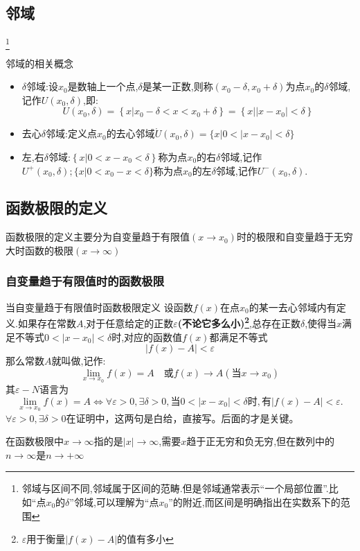 \documentclass[12pt, a4paper, oneside, UTF8]{ctexbook}  %
\begin{document}
\begin{sloppypar}
    \subsection{邻域}\footnote{邻域与区间不同,邻域属于区间的范畴.但是邻域通常表示“一个局部位置”.比如“点$x_0$的$\delta$”邻域,可以理解为“点$x_0$”的附近,而区间是明确指出在实数系下的范围}
    \begin{defn}{邻域的相关概念}{}
        \begin{itemize}
            \item $\delta$邻域:设$x_0$是数轴上一个点,$\delta$是某一正数,则称$(x_{0}-\delta,x_{0}+\delta)$为点$x_0$的$\delta$邻域,记作$U(x_{0},\delta)$,即:
                  $$
                      U(x_{0},\delta)=\left\{x|x_{0}-\delta<x<x_{0}+\delta\right\}=\left\{\left.x\right|\left|\left.x-x_{0}\right|<\delta\right\}\right.
                  $$
            \item 去心$\delta$邻域:定义点$x_0$的去心邻域$\mathring{U}(x_{0},\delta)=\bigl\{x|0<\bigl|x-x_{0}\bigr|<\delta\bigr\}$
            \item 左,右$\delta$邻域:$\left\{x|0<x-x_{0}<\delta\right\}$称为点$x_0$的右$\delta$邻域,记作$U^{+}(x_{0},\delta);\{x|0<x_{0}-x<\delta\}$称为点$x_0$的左$\delta$邻域,记作$U^{-}(x_{0},\delta).$
        \end{itemize}
    \end{defn}
    \subsection{函数极限的定义}
    函数极限的定义主要分为自变量趋于有限值$(x \to x_0)$时的极限和自变量趋于无穷大时函数的极限$(x \to \infty)$
    \subsubsection{自变量趋于有限值时的函数极限}
    \begin{defn}{当自变量趋于有限值时函数极限定义}{}
        设函数$f(x)$在点$x_0$的某一去心邻域内有定义.如果存在常数$A$,对于任意给定的正数$\varepsilon$\textbf{(不论它多么小)\footnote{$\varepsilon$用于衡量$|f(x)-A|$的值有多小}},总存在正数$\delta$,使得当$x$满足不等式$0<|x-x_0|<\delta$时,对应的函数值$f(x)$都满足不等式
        $$
            |f(x)-A|<\varepsilon
        $$
        那么常数$A$就叫做,记作:
        $$
            \lim_{x\to x_0}f(x)=A\quad\text{或}f(x)\to A(\text{当}x\to x_0)
        $$
        其$\varepsilon-N$语言为
        $$
            \lim_{x\to x_0}f(x)=A\Leftrightarrow\forall\varepsilon>0,\exists\delta>0,\text{当}0<|x-x_0|<\delta\text{时},\text{有}|f(x)-A|<\varepsilon.
        $$
        $\forall\varepsilon>0,\exists\delta>0$在证明中，这两句是白给，直接写。后面的才是关键。
    \end{defn}
    \begin{criterion}{}{}
        在函数极限中$x \to \infty$指的是$|x| \to \infty$,需要$x$趋于正无穷和负无穷,但在数列中的$n \to \infty$是$n \to +\infty$
    \end{criterion}


\end{sloppypar}
\end{document}
